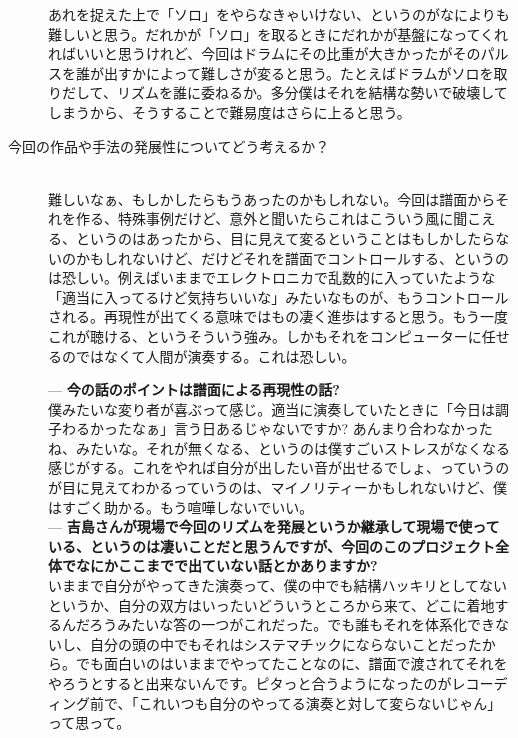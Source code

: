 \documentclass[uplatex,dvipdfmx]{ujarticle}
\begin{document}
\begin{description}
あれを捉えた上で「ソロ」をやらなきゃいけない、というのがなによりも難しいと思う。だれかが「ソロ」を取るときにだれかが基盤になってくれればいいと思うけれど、今回はドラムにその比重が大きかったがそのパルスを誰が出すかによって難しさが変ると思う。たとえばドラムがソロを取りだして、リズムを誰に委ねるか。多分僕はそれを結構な勢いで破壊してしまうから、そうすることで難易度はさらに上ると思う。\\

\item [今回の作品や手法の発展性についてどう考えるか？]\mbox{}\\

難しいなぁ、もしかしたらもうあったのかもしれない。今回は譜面からそれを作る、特殊事例だけど、意外と聞いたらこれはこういう風に聞こえる、というのはあったから、目に見えて変るということはもしかしたらないのかもしれないけど、だけどそれを譜面でコントロールする、というのは恐しい。例えばいままでエレクトロニカで乱数的に入っていたような「適当に入ってるけど気持ちいいな」みたいなものが、もうコントロールされる。再現性が出てくる意味ではもの凄く進歩はすると思う。もう一度これが聴ける、というそういう強み。しかもそれをコンピューターに任せるのではなくて人間が演奏する。これは恐しい。

--- {\bf 今の話のポイントは譜面による再現性の話?}\\

僕みたいな変り者が喜ぶって感じ。適当に演奏していたときに「今日は調子わるかったなぁ」言う日あるじゃないですか? あんまり合わなかったね、みたいな。それが無くなる、というのは僕すごいストレスがなくなる感じがする。これをやれば自分が出したい音が出せるでしょ、っていうのが目に見えてわかるっていうのは、マイノリティーかもしれないけど、僕はすごく助かる。もう喧嘩しないでいい。\\

--- {\bf 吉島さんが現場で今回のリズムを発展というか継承して現場で使っている、というのは凄いことだと思うんですが、今回のこのプロジェクト全体でなにかここまでで出ていない話とかありますか?}\\

いままで自分がやってきた演奏って、僕の中でも結構ハッキリとしてないというか、自分の双方はいったいどういうところから来て、どこに着地するんだろうみたいな答の一つがこれだった。でも誰もそれを体系化できないし、自分の頭の中でもそれはシステマチックにならないことだったから。でも面白いのはいままでやってたことなのに、譜面で渡されてそれをやろうとすると出来ないんです。ピタっと合うようになったのがレコーディング前で、「これいつも自分のやってる演奏と対して変らないじゃん」って思って。\\


\end{description}
\end{document}
